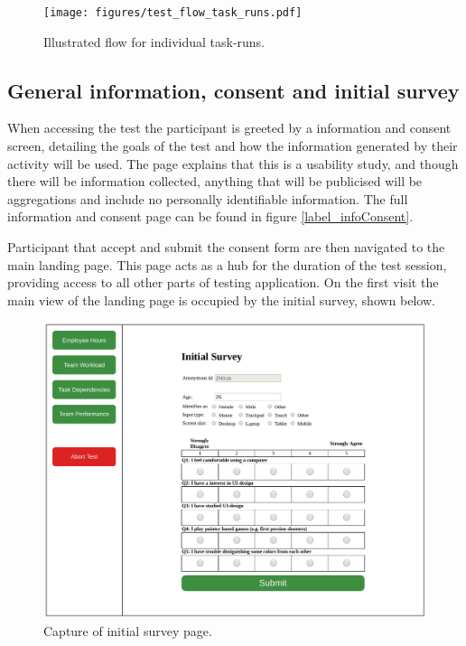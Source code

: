 \documentclass[nofilelist,dvipsnames]{cslthse-msc}
\begin{document}
{      \begin{figure}[h!]
        \centering
        \texttt{[image: figures/test\_flow\_task\_runs.pdf]}
        \caption{Illustrated flow for individual task-runs.}
      \end{figure}

      \subsection{General information, consent and initial survey}

        When accessing the test the participant is greeted by a information and
        consent screen, detailing the goals of the test and how the information
        generated by their activity will be used. The page explains that this
        is a usability study, and though there will be information collected,
        anything that will be publicised will be aggregations and include no
        personally identifiable information. The full information and consent
        page can be found in figure \ref{label_infoConsent}.

        Participant that accept and submit the consent form are then navigated
        to the main landing page. This page acts as a hub for the duration of
        the test session, providing access to all other parts of testing
        application. On the first visit the main view of the landing page is
        occupied by the initial survey, shown below.

        \begin{figure}[h!]
          \centering
          \includegraphics[width=.7\textwidth]{figures/captures/webapp_pre_survey.pdf}
          \caption{Capture of initial survey page.}
          \label{label_preSurvey}
        \end{figure}

}
\end{document}
